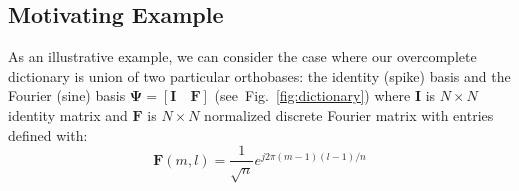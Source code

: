 \documentclass[journal]{IEEEtran}
\begin{document}
\subsection{Motivating Example}

As an illustrative example, we can consider the case where our overcomplete dictionary is union of two particular orthobases: the identity (spike) basis and the Fourier (sine) basis $\boldsymbol{\Psi} = [\boldsymbol{I}\quad \boldsymbol{F}]$ (see~Fig.~\ref{fig:dictionary}) where $\boldsymbol{I}$ is $N\times N$ identity matrix and $\boldsymbol{F}$ is $N\times N$ normalized discrete Fourier matrix with entries defined with:
%
\begin{equation} \label{eq:fourier}
\boldsymbol{F}(m,l)=\frac{1}{\sqrt{n}} e^{j2\pi(m-1)(l-1)/n}
\end{equation}
\end{document}
